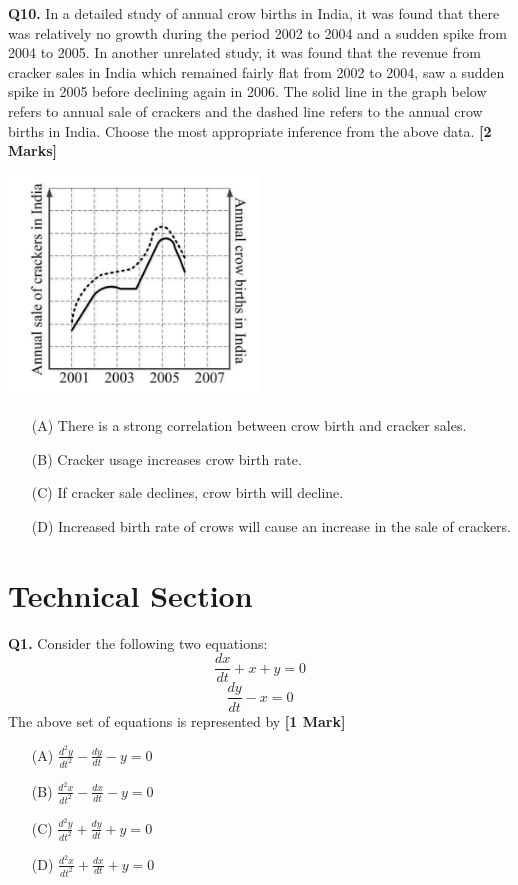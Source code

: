 \documentclass[11pt]{article}
\newcommand{\questiona}[2]{
    \noindent\textbf{Q#2.} #1 \hfill \textbf{[1 Mark]}
}
\newcommand{\questionb}[2]{
    \noindent\textbf{Q#2.} #1 \hfill \textbf{[2 Marks]}
}
\begin{document}
\questionb{In a detailed study of annual crow births in India, it was found that there was relatively no growth during the period 2002 to 2004 and a sudden spike from 2004 to 2005. In another unrelated study, it was found that the revenue from cracker sales in India which remained fairly flat from 2002 to 2004, saw a sudden spike in 2005 before declining again in 2006. The solid line in the graph below refers to annual sale of crackers and the dashed line refers to the annual crow births in India. Choose the most appropriate inference from the above data.}{10}
\begin{center}
\includegraphics[width=0.5\textwidth]{figures/Q10.png}
\end{center}
\begin{enumerate}
    \item[(A)] There is a strong correlation between crow birth and cracker sales.  
    \item[(B)] Cracker usage increases crow birth rate.  
    \item[(C)] If cracker sale declines, crow birth will decline.  
    \item[(D)] Increased birth rate of crows will cause an increase in the sale of crackers.  
\end{enumerate}

\section*{Technical Section}

\questiona{Consider the following two equations:
\[\frac{dx}{dt} + x + y = 0\]
\[\frac{dy}{dt} - x = 0\]
The above set of equations is represented by}{1}
\begin{enumerate}
    \item[(A)] \(\frac{d^2 y}{dt^2} - \frac{dy}{dt} - y = 0\)  
    \item[(B)] \(\frac{d^2 x}{dt^2} - \frac{dx}{dt} - y = 0\)  
    \item[(C)] \(\frac{d^2 y}{dt^2} + \frac{dy}{dt} + y = 0\)  
    \item[(D)] \(\frac{d^2 x}{dt^2} + \frac{dx}{dt} + y = 0\)  
\end{enumerate}
\end{document}
